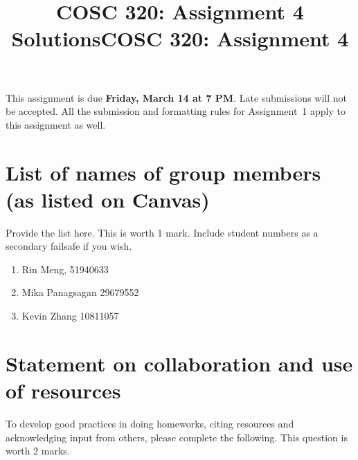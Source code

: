 \documentclass[11pt,fleqn]{exam}
\author{}
\date{}
\title{COSC 320: Assignment 4 Solutions}
\title{COSC 320: Assignment 4}
\newif\ifsolutions\solutionstrue
\newif\ifsolutions\solutionsfalse
\begin{document}
	\maketitle
	
	
	\ifsolutions
\setcounter{section}{2}
\else
This assignment is due \textbf{Friday, March 14 at 7 PM}. Late submissions will not be accepted. All the submission and formatting rules for Assignment~1 apply to this assignment as well.  

\section{List of names of group members (as listed on Canvas)}

Provide the list here. This is worth 1 mark. Include student numbers as a secondary failsafe if you wish.

\begin{enumerate}
   \item Rin Meng, 51940633
   \item Mika Panagsagan 29679552
    \item Kevin Zhang 10811057
\end{enumerate}

\section{Statement on collaboration and use of resources}
To develop good practices in doing homeworks, citing resources and acknowledging input from others, please complete the following. This question is worth 2 marks.
\end{document}
